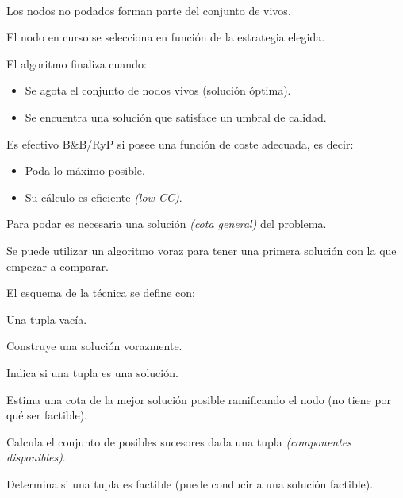 \documentclass[tikz,11pt,fleqn]{book} %
\begin{document}
\begin{theorem}~

    Los nodos no podados forman parte del conjunto de vivos.
    
    El nodo en curso se selecciona en función de la estrategia elegida.

    El algoritmo finaliza cuando:
    \begin{itemize}
        \item Se agota el conjunto de nodos vivos (solución óptima).
        \item Se encuentra una solución que satisface un umbral de calidad.
    \end{itemize}
    
    Es efectivo B\&B/RyP si posee una función de coste adecuada, es decir:
    \begin{itemize}
        \item Poda lo máximo posible.
        \item Su cálculo es eficiente \textit{(low CC)}.
    \end{itemize}

    Para podar es necesaria una solución \textit{(cota general)} del problema.

    Se puede utilizar un algoritmo voraz para tener una primera solución con la que empezar a comparar.
    
\end{theorem}

El esquema de la técnica se define con:

\begin{definition} Una tupla vacía. \end{definition}
\begin{definition} Construye una solución vorazmente. \end{definition}
\begin{definition}[es\_sln()] Indica si una tupla es una solución. \end{definition}
\begin{definition} Estima una cota de la mejor solución posible ramificando el nodo (no tiene por qué ser factible). \end{definition}
\begin{definition}[complexiones()] Calcula el conjunto de posibles sucesores dada una tupla \textit{(componentes disponibles)}. \end{definition}
\begin{definition}[es\_factible()] Determina si una tupla es factible (puede conducir a una solución factible). \end{definition}
\end{document}
